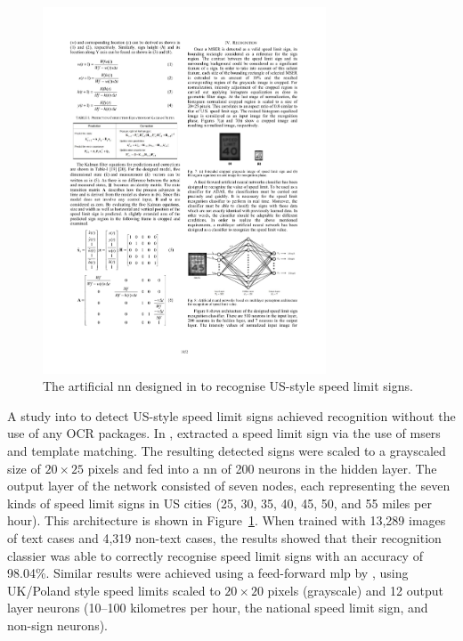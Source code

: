 \begin{figure}[h]
  \centering
  \includegraphics[width=0.75\textwidth]{images/background/kundu2015_nn}
  \caption[A NN designed to recognised speed limit signs]{The artificial  \gls{nn} designed in \citet{Kundu:2015vq} to recognise US-style speed limit signs.}
  \label{fig:background:recognition:kundu2015_nn}
\end{figure}

A \citeyear{Kundu:2015vq} study into  to detect US-style speed limit signs achieved recognition without the use of any OCR packages. In \citep{Kundu:2015vq}, \citeauthor{Kundu:2015vq} extracted a speed limit sign via the use of \glspl{mser} and template matching. The resulting detected signs were scaled to a grayscaled size of $20 \times 25$ pixels and fed into a  \gls{nn} of 200 neurons in the hidden layer. The output layer of the network consisted of seven nodes, each representing the seven kinds of speed limit signs in US cities (25, 30, 35, 40, 45, 50, and 55 miles per hour). This architecture is shown in Figure~\ref{fig:background:recognition:kundu2015_nn}. When trained with 13,289 images of text cases and 4,319 non-text cases, the results showed that their recognition classier was able to correctly recognise speed limit signs with an accuracy of 98.04\%. Similar results were achieved using a feed-forward \gls{mlp} by \citet{Eichner:2008dw}, using UK/Poland style speed limits scaled to $20 \times 20$ pixels (grayscale) and 12 output layer neurons (10--100 kilometres per hour, the national speed limit sign, and non-sign neurons).

